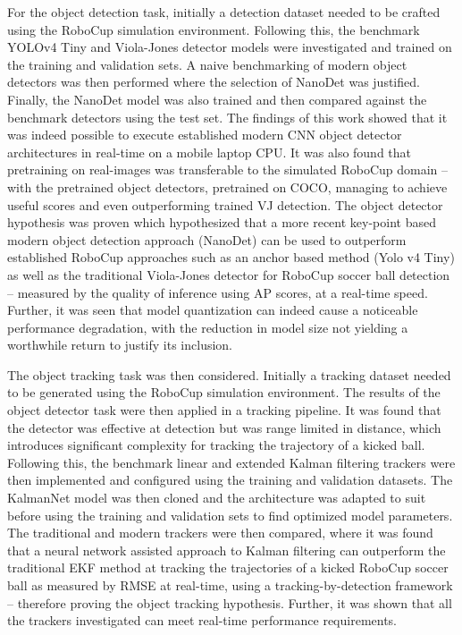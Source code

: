 \documentclass[a4paper,twoside,12pt]{report}
\begin{document}
For the object detection task, initially a detection dataset needed to be crafted using the RoboCup simulation environment. Following this, the benchmark YOLOv4 Tiny and Viola-Jones detector models were investigated and trained on the training and validation sets. A naive benchmarking of modern object detectors was then performed where the selection of NanoDet was justified. Finally, the NanoDet model was also trained and then compared against the benchmark detectors using the test set. The findings of this work showed that it was indeed possible to execute established modern CNN object detector architectures in real-time on a mobile laptop CPU. It was also found that pretraining on real-images was transferable to the simulated RoboCup domain -- with the pretrained object detectors, pretrained on COCO, managing to achieve useful scores and even outperforming trained VJ detection. The object detector hypothesis was proven which hypothesized that a more recent key-point based modern object detection approach (NanoDet) can be used to outperform established RoboCup approaches such as an anchor based method (Yolo v4 Tiny) as well as the traditional Viola-Jones detector for RoboCup soccer ball detection -- measured by the quality of inference using AP scores, at a real-time speed. Further, it was seen that model quantization can indeed cause a noticeable performance degradation, with the reduction in model size not yielding a worthwhile return to justify its inclusion. 

The object tracking task was then considered. Initially a tracking dataset needed to be generated using the RoboCup simulation environment. The results of the object detector task were then applied in a tracking pipeline. It was found that the detector was effective at detection but was range limited in distance, which introduces significant complexity for tracking the trajectory of a kicked ball. Following this, the benchmark linear and extended Kalman filtering trackers were then implemented and configured using the training and validation datasets. The KalmanNet model was then cloned and the architecture was adapted to suit before using the training and validation sets to find optimized model parameters. The traditional and modern trackers were then compared, where it was found that a neural network assisted approach to Kalman filtering can outperform the traditional EKF method at tracking the trajectories of a kicked RoboCup soccer ball as measured by RMSE at real-time, using a tracking-by-detection framework -- therefore proving the object tracking hypothesis. Further, it was shown that all the trackers investigated can meet real-time performance requirements.
\end{document}
